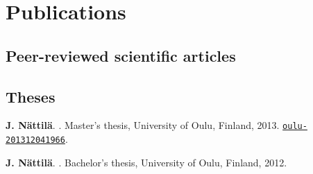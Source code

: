 \documentclass[10pt]{article}
\begin{document}

\section*{Publications}
\subsection*{\phantom{sub} Peer-reviewed scientific articles}

\vspace{-20pt}
\renewcommand\refname{\phantom{bla}}



\nocite{*}


\subsection*{}
\subsection*{}
\subsection*{\phantom{sub} Theses}

\vspace{-20pt}
%
\begin{thebibliography}{3}

\textbf{J. N\"attil\"a}.
.
\newblock Master's thesis, University of Oulu, Finland, 2013. \href{http://urn.fi/URN:NBN:fi:oulu-201312041966}{\nolinkurl{oulu-201312041966}}.

\textbf{J. N\"attil\"a}.
.
\newblock Bachelor's thesis, University of Oulu, Finland, 2012.

\end{thebibliography}
\end{document}
